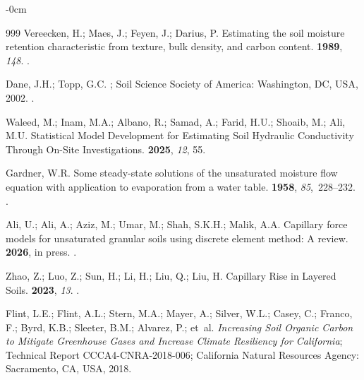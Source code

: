 \documentclass[land,review,accept,pdftex,oneauthor]{Definitions/mdpi}
\begin{document}
\begin{adjustwidth}{-\extralength}{0cm}
\begin{thebibliography}{999}
Vereecken, H.; Maes, J.; Feyen, J.; Darius, P.
\newblock Estimating the soil moisture retention characteristic from texture,
  bulk density, and carbon content.
 {\bf 1989}, {\em 148}.
.

Dane, J.H.; Topp, G.C.
; Soil
  Science Society of America:  Washington, DC, USA, 2002.
.

Waleed, M.; Inam, M.A.; Albano, R.; Samad, A.; Farid, H.U.; Shoaib, M.; Ali,
  M.U.
\newblock Statistical Model Development for Estimating Soil Hydraulic
  Conductivity Through On-Site Investigations.
 {\bf 2025}, {\em 12}, 55.

Gardner, W.R.
\newblock Some steady-state solutions of the unsaturated moisture flow equation
  with application to evaporation from a water table.
 {\bf 1958}, {\em 85},~228--232.
.

Ali, U.; Ali, A.; Aziz, M.; Umar, M.; Shah, S.K.H.; Malik, A.A.
\newblock Capillary force models for unsaturated granular soils using discrete
  element method: A review.
 {\bf 2026}, in press. %
.

Zhao, Z.; Luo, Z.; Sun, H.; Li, H.; Liu, Q.; Liu, H.
\newblock Capillary Rise in Layered Soils.
 {\bf 2023}, {\em 13}.
.

Flint, L.E.; Flint, A.L.; Stern, M.A.; Mayer, A.; Silver, W.L.; Casey, C.;
  Franco, F.; Byrd, K.B.; Sleeter, B.M.; Alvarez, P.;  et~al.
\newblock \emph{Increasing Soil Organic Carbon to Mitigate Greenhouse Gases and
  Increase Climate Resiliency for {California}};
\newblock Technical Report CCCA4-CNRA-2018-006; California Natural Resources
  Agency: Sacramento, CA, USA,  2018.


\end{thebibliography}
\end{adjustwidth}
\end{document}
